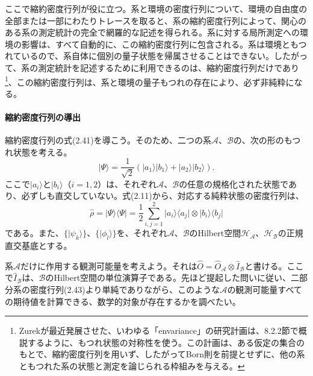 ここで縮約密度行列が役に立つ。系と環境の密度行列について、環境の自由度の全部または一部にわたりトレースを取ると、系の縮約密度行列によって、関心のある系の測定統計の完全で網羅的な記述を得られる。系に対する局所測定への環境の影響は、すべて自動的に、この縮約密度行列に包含される。系は環境ともつれているので、系自体に個別の量子状態を帰属させることはできない。したがって、系の測定統計を記述するために利用できるのは、縮約密度行列だけであり\footnote{Zurekが最近発展させた、いわゆる「envariance」の研究計画\cite{ref016,ref065,ref066,ref067}は、8.2.2節で概説するように、もつれ状態の対称性を使う。この計画は、ある仮定の集合のもとで、縮約密度行列を用いず、したがってBorn則を前提とせずに、他の系ともつれた系の状態と測定を論じられる枠組みを与える。}、この縮約密度行列は、系と環境の量子もつれの存在により、必ず非純粋になる。

\paragraph{縮約密度行列の導出}
縮約密度行列の式(2.41)を導こう。そのため、二つの系$\mathcal A$、$\mathcal B$の、次の形のもつれ状態を考える。
\begin{equation}\lvert\Psi\rangle=\frac1{\sqrt2}(\lvert a_1\rangle\lvert b_1\rangle+\lvert a_2\rangle\lvert b_2\rangle).\tag{2.42}\end{equation}
ここで$\lvert a_i\rangle$と$\lvert b_i\rangle$（$i=1,2$）は、それぞれ$\mathcal A$、$\mathcal B$の任意の規格化された状態であり、必ずしも直交していない。式(2.11)から、対応する純粋状態の密度行列は、
\begin{equation}\hat\rho=\lvert\Psi\rangle\langle\Psi\rvert=\frac12\sum_{i,j=1}^2\lvert a_i\rangle\langle a_j\rvert\otimes\lvert b_i\rangle\langle b_j\rvert\tag{2.43}\end{equation}
である。また、$\{\lvert\psi_k\rangle\}$、$\{\lvert\phi_l\rangle\}$を、それぞれ$\mathcal A$、$\mathcal B$のHilbert空間$\mathcal H_{\mathcal A}$、$\mathcal H_{\mathcal B}$の正規直交基底とする。

\hypertarget{srcpage:46}{}\label{srcpage:46}
系$\mathcal A$だけに作用する観測可能量を考えよう。それは$\hat O=\hat O_{\mathcal A}\otimes\hat I_{\mathcal B}$と書ける。ここで$\hat I_{\mathcal B}$は、$\mathcal B$のHilbert空間の単位演算子である。先ほど提起した問いに従い、二部分系の密度行列(2.43)より単純でありながら、このような$\mathcal A$の観測可能量すべての期待値を計算できる、数学的対象が存在するかを調べたい。

